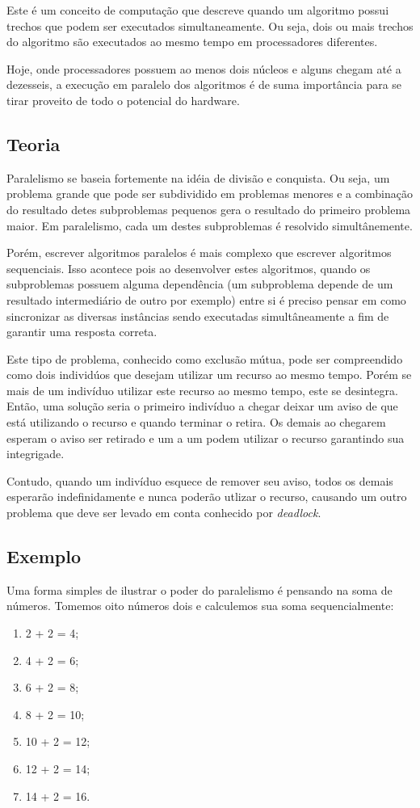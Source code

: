 \documentclass[a4paper,11pt]{report}
\begin{document}
    Este é um conceito de computação que descreve quando um algoritmo possui trechos que podem ser executados simultaneamente. Ou seja, dois ou mais trechos do algoritmo são executados ao mesmo tempo em processadores diferentes.
    
    Hoje, onde processadores possuem ao menos dois núcleos e alguns chegam até a dezesseis, a execução em paralelo dos algoritmos é de suma importância para se tirar proveito de todo o potencial do hardware.
  
    \subsection{Teoria}
    Paralelismo se baseia fortemente na idéia de divisão e conquista. Ou seja, um problema grande que pode ser subdividido em problemas menores e a combinação do resultado detes subproblemas pequenos gera o resultado do primeiro problema maior. Em paralelismo, cada um destes subproblemas é resolvido simultânemente.
    
    Porém, escrever algoritmos paralelos é mais complexo que escrever algoritmos sequenciais. Isso acontece pois ao desenvolver estes algoritmos, quando os subproblemas possuem alguma dependência (um subproblema depende de um resultado intermediário de outro por exemplo) entre si é preciso pensar em como sincronizar as diversas instâncias sendo executadas simultâneamente a fim de garantir uma resposta correta.
    
    Este tipo de problema, conhecido como exclusão mútua, pode ser compreendido como dois individúos que desejam utilizar um recurso ao mesmo tempo. Porém se mais de um indivíduo utilizar este recurso ao mesmo tempo, este se desintegra. Então, uma solução seria o primeiro indivíduo a chegar deixar um aviso de que está utilizando o recurso e quando terminar o retira. Os demais ao chegarem esperam o aviso ser retirado e um a um podem utilizar o recurso garantindo sua integrigade.
    
    Contudo, quando um indivíduo esquece de remover seu aviso, todos os demais esperarão indefinidamente e nunca poderão utlizar o recurso, causando um outro problema que deve ser levado em conta conhecido por \textit{deadlock}.
    
    \subsection{Exemplo}
    
    Uma forma simples de ilustrar o poder do paralelismo é pensando na soma de números. Tomemos oito números dois e calculemos sua soma sequencialmente:
    \begin{enumerate}
      \item 2 + 2 = 4;
      \item 4 + 2 = 6;
      \item 6 + 2 = 8;
      \item 8 + 2 = 10;
      \item 10 + 2 = 12;
      \item 12 + 2 = 14;
      \item 14 + 2 = 16.
    \end{enumerate}
    
\end{document}

